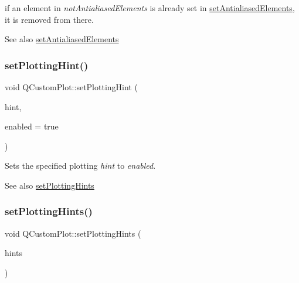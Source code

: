 if an element in {\itshape not\+Antialiased\+Elements} is already set in \mbox{\hyperlink{class_q_custom_plot_af6f91e5eab1be85f67c556e98c3745e8}{set\+Antialiased\+Elements}}, it is removed from there.

\begin{DoxySeeAlso}{See also}
\mbox{\hyperlink{class_q_custom_plot_af6f91e5eab1be85f67c556e98c3745e8}{set\+Antialiased\+Elements}} 
\end{DoxySeeAlso}
\mbox{\label{class_q_custom_plot_a3b7c97bb6c16464e9e15190c07abe9a9}} 
\subsubsection{\texorpdfstring{set\+Plotting\+Hint()}{setPlottingHint()}}
{\footnotesize\ttfamily void Q\+Custom\+Plot\+::set\+Plotting\+Hint (\begin{DoxyParamCaption}\item[{\mbox{\hyperlink{namespace_q_c_p_a5400e5fcb9528d92002ddb938c1f4ef4}{Q\+C\+P\+::\+Plotting\+Hint}}}]{hint,  }\item[{bool}]{enabled = {\ttfamily true} }\end{DoxyParamCaption})}

Sets the specified plotting {\itshape hint} to {\itshape enabled}.

\begin{DoxySeeAlso}{See also}
\mbox{\hyperlink{class_q_custom_plot_a94a33cbdadbbac5934843508bcfc210d}{set\+Plotting\+Hints}} 
\end{DoxySeeAlso}
\mbox{\label{class_q_custom_plot_a94a33cbdadbbac5934843508bcfc210d}} 
\subsubsection{\texorpdfstring{set\+Plotting\+Hints()}{setPlottingHints()}}
{\footnotesize\ttfamily void Q\+Custom\+Plot\+::set\+Plotting\+Hints (\begin{DoxyParamCaption}\item[{const Q\+C\+P\+::\+Plotting\+Hints \&}]{hints }\end{DoxyParamCaption})}

